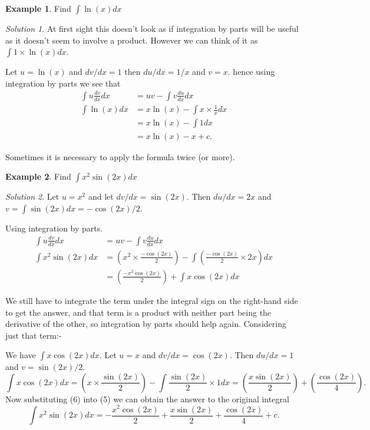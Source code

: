 \documentclass[
  11pt,
  oneside]{book}
\newcommand{\slide}{}
\theoremstyle{definition}
\theoremstyle{definition}
\newtheorem{example}{Example}[chapter]
\theoremstyle{definition}
\theoremstyle{definition}
\theoremstyle{remark}
\newtheorem*{solution}{Solution}
\begin{document}
\slide

\begin{example}
Find \(\displaystyle\int \ln(x)dx\)
\end{example}

\begin{solution}
At first sight this doesn't look as if integration by parts will be useful as it doesn't seem to involve a product. However we can think of it as \(\displaystyle\int 1\times\ln(x)dx\).

Let \(u = \ln(x)\) and \(dv/dx = 1\) then \(du/dx = 1/x\) and \(v = x\). hence using integration by parts we see that
\begin{align*}
\int u\frac{dv}{dx}dx& = uv-\int v\frac{du}{dx}dx\\
\int\ln(x)dx&=x\ln(x)-\int x\times\frac 1x dx\\
&=x\ln(x)-\int 1dx\\
&=x\ln(x)-x + c.
\end{align*}
\end{solution}

\slide

Sometimes it is necessary to apply the formula twice (or more).

\begin{example}
Find \(\displaystyle\int x^2\sin(2x)dx\)
\end{example}

\begin{solution}
Let \(u = x^2\) and let \(dv/dx = \sin(2x)\). Then \(du/dx = 2x\) and \(v = \displaystyle\int \sin(2x)dx = -\cos(2x)/2\).

Using integration by parts.
\begin{align*}
\int u\frac{dv}{dx}dx& = uv-\int v\frac{du}{dx}dx\\
\int x^2\sin(2x)dx&=\left(x^2\times\frac{-\cos(2x)}{2}\right)-\int\left(\frac{-\cos(2x)}{2}\times2x\right)dx\\
&=\left(\frac{-x^2\cos(2x)}{2}\right)+\int x\cos(2x)dx\tag{5}
\end{align*}

We still have to integrate the term under the integral sign on the right-hand side to get the answer, and that term is a product with neither part being the derivative of the other, so integration by parts should help again. Considering just that term:-

\slide

We have \(\displaystyle\int x\cos(2x)dx\). Let \(u=x\) and \(dv/dx = \cos(2x)\). Then \(du/dx = 1\) and \(v=\sin(2x)/2\).
\[
\int x\cos(2x)dx = \left(x\times\frac{\sin(2x)}{2}\right) - \int\frac{\sin(2x)}{2}\times1dx = \left(\frac{x\sin(2x)}2\right)+\left(\frac{\cos(2x)}4\right)\tag{6}.
\]
Now substituting (6) into (5) we can obtain the answer to the original integral
\[
\int x^2\sin(2x)dx = -\frac{x^2\cos(2x)}2+\frac{x\sin(2x)}2+\frac{\cos(2x)}4 + c.
\]
\end{solution}
\end{document}
